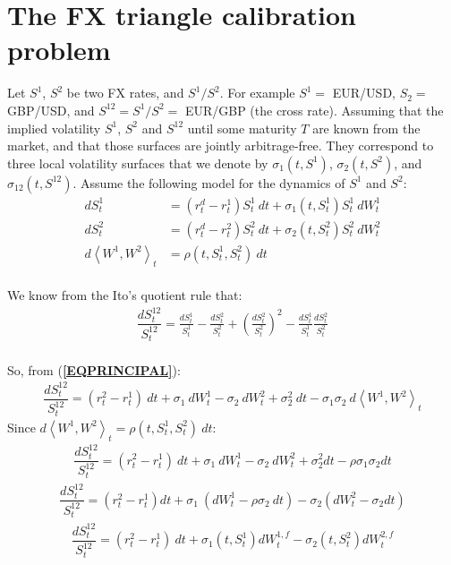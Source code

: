 \documentclass[a4paper, 12pt]{article}
\numberwithin{equation}{subsection}
\begin{document}
\section{The FX triangle calibration problem}
Let $S^1$, $S^2$ be two FX rates, and $S^1 / S^2$. For example $S^1 = $ EUR/USD, $S_2 = $ GBP/USD, and $S^{12} = S^1/S^2 = $ EUR/GBP (the cross rate). Assuming that the implied volatility $S^1$, $S^2$ and $S^{12}$ until some maturity $T$ are known from the market, and that those surfaces are jointly arbitrage-free. They correspond to three local volatility surfaces that we denote by $\sigma_1(t,S^1)$, $\sigma_2(t,S^2)$, and $\sigma_{12}(t,S^{12})$. Assume the following model for the dynamics of $S^1$ and $S^2$:
\begin{align}\label{EQPRINCIPAL}
	d S_t^1 &= (r_t^d - r_t^1)S_t^1 \:dt + \sigma_1(t,S_t^1)S_t^1\:dW_t^1 \nonumber\\
    d S_t^2 &= (r_t^d - r_t^2)S_t^2 \:dt + \sigma_2(t,S_t^2)S_t^2\:dW_t^2 \nonumber\\
    d \left\langle W^1,W^2 \right\rangle_t &= \rho(t,S_t^1,S_t^2)\: dt 
\end{align}
\\
We know from the Ito's quotient rule that:
\begin{align}
\dfrac{dS^{12}_{t}}{S^{12}_{t}} = \frac{d S_t^1}{S_t^1} - \frac{dS_t^2}{S_t^2} + \left( \frac{dS_t^2}{S_t^2} \right)^2 - \frac{d S_t^1}{S_t^1}\frac{dS_t^2}{S_t^2} 
\end{align}
\\
So, from (\textbf{\ref{EQPRINCIPAL}}):
\begin{align}
\dfrac{dS^{12}_{t}}{S^{12}_{t}}  = (r_t^2 - r_t^1)\:dt + \sigma_1 \:dW_t^1 - \sigma_2 \: dW_t^2 + \sigma_2^2 \:dt -\sigma_1\sigma_2 \: d \left\langle W^1,W^2 \right\rangle_t
\end{align}
Since $d \left\langle W^1,W^2 \right\rangle_t = \rho(t,S_t^1,S_t^2)\:dt$:
\begin{align}
\dfrac{dS^{12}_{t}}{S^{12}_{t}}  = (r_t^2 - r_t^1) \:dt + \sigma_1 \:dW_t^1 - \sigma_2 \:dW_t^2 + \sigma_2^2dt -\rho\sigma_1\sigma_2dt
\end{align}
\begin{align}
\dfrac{dS^{12}_{t}}{S^{12}_{t}}  = (r_t^2 - r_t^1)dt + \sigma_1 \: \left(dW_t^1 - \rho\sigma_2 \:dt \right) - \sigma_2(dW_t^2 -\sigma_2dt )
\end{align}
\begin{align}
\dfrac{dS^{12}_{t}}{S^{12}_{t}} = (r^{2}_t - r^{1}_t) \:dt + \sigma_1 \left(t, S^{1}_t \right)dW_t^{1,f} - \sigma_2(t, S_t^{2})dW_t^{2,f}
\end{align}
\end{document}

